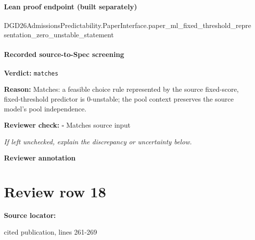 \documentclass[10pt]{article}
\newcommand{\reviewerbox}{%
  \par\noindent\fbox{\parbox{0.96\linewidth}{\rule{0pt}{0.38in}}}\par
}
\newcommand{\reviewmatch}[1]{%
  \par\noindent\textbf{Reviewer check:} $\square$\; #1\par
  \noindent\emph{If left unchecked, explain the discrepancy or uncertainty below.}\par
}
\begin{document}
\paragraph{Lean proof endpoint (built separately)}\begin{ReviewVerbatim}
DGD26AdmissionsPredictability.PaperInterface.paper_ml_fixed_threshold_representation_zero_unstable_statement
\end{ReviewVerbatim}

\paragraph{Recorded source-to-Spec screening}
\textbf{Verdict:} \texttt{matches}
\\
{\raggedright
\textbf{Reason:} Matches:\allowbreak{} a feasible choice rule represented by the source fixed-\allowbreak{}score, fixed-\allowbreak{}threshold predictor is 0-\allowbreak{}unstable;\allowbreak{} the pool context preserves the source model's pool independence.\allowbreak{}
\par}
\reviewmatch{Matches source input}
\noindent\textbf{Reviewer annotation}\par
\reviewerbox
\clearpage
\hypertarget{source-claim-d21050cec8d233b0}{}
\section*{Review row 18}
\textbf{Source locator:} {\footnotesize\raggedright cited publication, lines 261-\allowbreak{}269\par}
\end{document}
